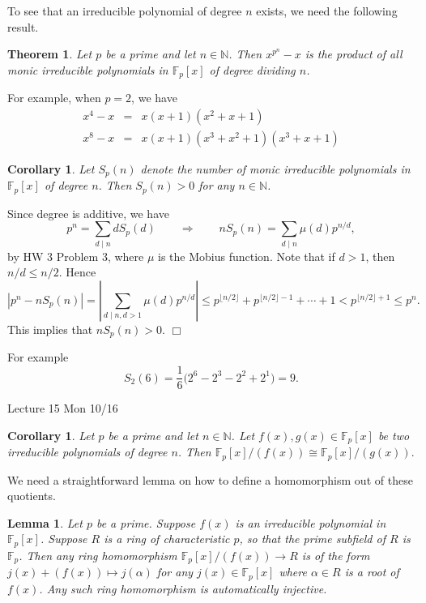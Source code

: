\documentclass{article}
\def\F{{\mathbb F}}
\def\N{{\mathbb N}}
\def\F{{\mathbb F}}
\newtheorem{theorem}[subsection]{Theorem}
\newtheorem{cor}[subsection]{Corollary}
\newtheorem{lemma}[subsection]{Lemma}
\newenvironment{proof}{\noindent {\bf Proof:}}{$\Box$ \vspace{2 ex}}
\newcommand{\add}[1]{{\color{blue} #1}}
\begin{document}
To see that an irreducible polynomial of degree $n$ exists, we need the following result.

\begin{theorem}\label{thm:fact}
    Let $p$ be a prime and let $n\in\N$. Then $x^{p^n}-x$ is the product of all monic irreducible polynomials in $\F_p[x]$ of degree dividing $n$.
\end{theorem}

For example, when $p = 2$, we have
\begin{eqnarray*}
    x^4 - x &=& x(x + 1)(x^2 + x + 1)\\
    x^8 - x &=& x(x + 1)(x^3 + x^2 + 1)(x^3 + x + 1)
\end{eqnarray*}

\begin{cor}
    Let $S_p(n)$ denote the number of monic irreducible polynomials in $\F_p[x]$ of degree $n$. Then $S_p(n)>0$ for any $n\in\N$.
\end{cor}

\begin{proof}
 Since degree is additive, we have 
$$p^n = \sum_{d\mid n}dS_p(d) \qquad\Longrightarrow\qquad nS_p(n) = \sum_{d\mid n}\mu(d)p^{n/d},$$
by HW 3 Problem 3, where $\mu$ is the Mobius function.
Note that if $d>1$, then $n/d \leq n/2$. Hence
$$|p^n - nS_p(n)|  = \left|\sum_{d\mid n,d>1} \mu(d)p^{n/d}\right| \leq p^{\lfloor n/2\rfloor} + p^{\lfloor n/2\rfloor-1} + \cdots + 1 < p^{\lfloor n/2\rfloor+1} \leq p^n.$$
This implies that $nS_p(n) > 0$.
\end{proof}

For example
$$S_2(6) = \frac{1}{6}\Big(2^6 - 2^3 - 2^2 + 2^1\Big) = 9.$$

\begin{center}
    \add{Lecture 15 Mon 10/16}
\end{center}

\begin{cor}\label{cor:iso}
    Let $p$ be a prime and let $n\in\N$. Let $f(x),g(x)\in\F_p[x]$ be two irreducible polynomials of degree $n$. Then $\F_p[x]/(f(x))\cong \F_p[x]/(g(x)).$
\end{cor}

We need a straightforward lemma on how to define a homomorphism out of these quotients.
\begin{lemma}\label{lem:mapf}
    Let $p$ be a prime. Suppose $f(x)$ is an irreducible polynomial in $\F_p[x]$. Suppose $R$ is a ring of characteristic $p$, so that the prime subfield of $R$ is $\F_p$. Then any ring homomorphism $\F_p[x]/(f(x))\rightarrow R$ is of the form $j(x) + (f(x))\mapsto j(\alpha)$ for any $j(x)\in\F_p[x]$ where $\alpha\in R$ is a root of $f(x)$. Any such ring homomorphism is automatically injective.
\end{lemma}
\end{document}
